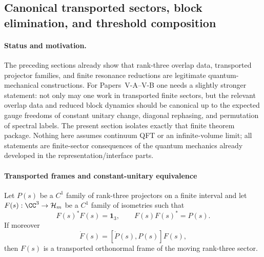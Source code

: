 \documentclass[12pt,a4paper]{article}
\begin{document}
\subsection{Canonical transported sectors, block elimination, and threshold composition}
\label{p4:sec:part2-canonical-transported-blocks}

\paragraph{Status and motivation.}
The preceding sections already show that rank-three overlap data, transported projector families, and finite resonance reductions are legitimate quantum-mechanical constructions.
For Papers~V-A--V-B one needs a slightly stronger statement: not only may one work in transported finite sectors, but the relevant overlap data and reduced block dynamics should be canonical up to the expected gauge freedoms of constant unitary change, diagonal rephasing, and permutation of spectral labels.
The present section isolates exactly that finite theorem package.
Nothing here assumes continuum QFT or an infinite-volume limit; all statements are finite-sector consequences of the quantum mechanics already developed in the representation/interface parts.



\paragraph{Transported frames and constant-unitary equivalence}
\label{p4:sec:part2-transported-frame-equivalence}

Let $P(s)$ be a $C^1$ family of rank-three projectors on a finite interval and let $F(s):\CC^3\to\mathcal H_m$ be a $C^1$ family of isometries such that
\begin{equation}
\label{p4:eq:transported-isometry-projector}
F(s)^*F(s)=\mathbf 1_3,
\qquad
F(s)F(s)^*=P(s).
\end{equation}
If moreover
\begin{equation}
\label{p4:eq:transported-isometry-kato}
\dot F(s)=[\dot P(s),P(s)]F(s),
\end{equation}
then $F(s)$ is a transported orthonormal frame of the moving rank-three sector.
\end{document}
